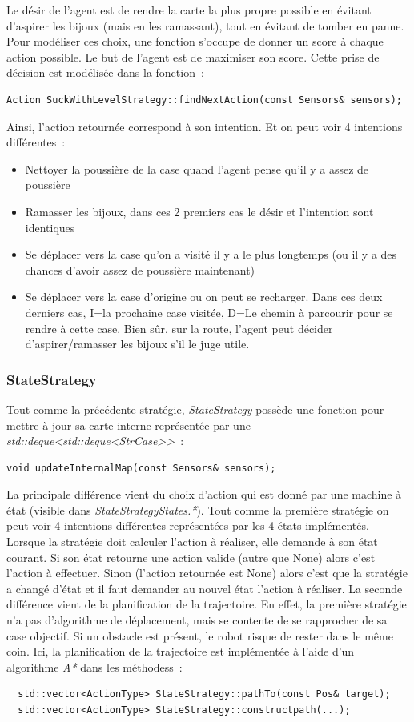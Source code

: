 \documentclass{article}
\begin{document}
Le désir de l'agent est de rendre la carte la plus propre possible en évitant d'aspirer les bijoux (mais en les ramassant), tout en évitant de tomber en panne. Pour modéliser ces choix, une fonction s'occupe de donner un score à chaque action possible. Le but de l'agent est de maximiser son score. Cette prise de décision est modélisée dans la fonction~:
\begin{verbatim}
Action SuckWithLevelStrategy::findNextAction(const Sensors& sensors);
\end{verbatim}
Ainsi, l'action retournée correspond à son intention. Et on peut voir 4 intentions différentes~:
\begin{itemize}
    \item Nettoyer la poussière de la case quand l'agent pense qu'il y a assez de poussière
    \item Ramasser les bijoux, dans ces 2 premiers cas le désir et l'intention sont identiques
    \item Se déplacer vers la case qu'on a visité il y a le plus longtemps (ou il y a des chances d'avoir assez de poussière maintenant)
    \item Se déplacer vers la case d'origine ou on peut se recharger. Dans ces deux derniers cas, I=la prochaine case visitée, D=Le chemin à parcourir pour se rendre à cette case. Bien sûr, sur la route, l'agent peut décider d'aspirer/ramasser les bijoux s'il le juge utile.
\end{itemize}

\subsubsection{StateStrategy}

Tout comme la précédente stratégie, \emph{StateStrategy} possède une fonction pour mettre à jour sa carte interne représentée par une \emph{std::deque<std::deque<StrCase>>}~:
\begin{verbatim}
void updateInternalMap(const Sensors& sensors);
\end{verbatim}
La principale différence vient du choix d'action qui est donné par une machine à
état (visible dans \emph{StateStrategyStates.*}). Tout comme la première
stratégie on peut voir 4 intentions différentes représentées par les 4 états
implémentés. Lorsque la stratégie doit calculer l'action à réaliser, elle
demande à son état courant. Si son état retourne une action valide (autre que
None) alors c'est l'action à effectuer. Sinon (l'action retournée est None)
alors c'est que la stratégie a changé d'état et il faut demander au nouvel état
l'action à réaliser.
La seconde différence vient de la planification de la trajectoire. En effet, la
première stratégie n'a pas d'algorithme de déplacement, mais se contente de se
rapprocher de sa case objectif. Si un obstacle est présent, le robot risque de
rester dans le même coin. Ici, la planification de la trajectoire est
implémentée à l'aide d'un algorithme \emph{A*} dans les méthodess~:
\begin{verbatim}
  std::vector<ActionType> StateStrategy::pathTo(const Pos& target);
  std::vector<ActionType> StateStrategy::constructpath(...);
\end{verbatim}
\end{document}
